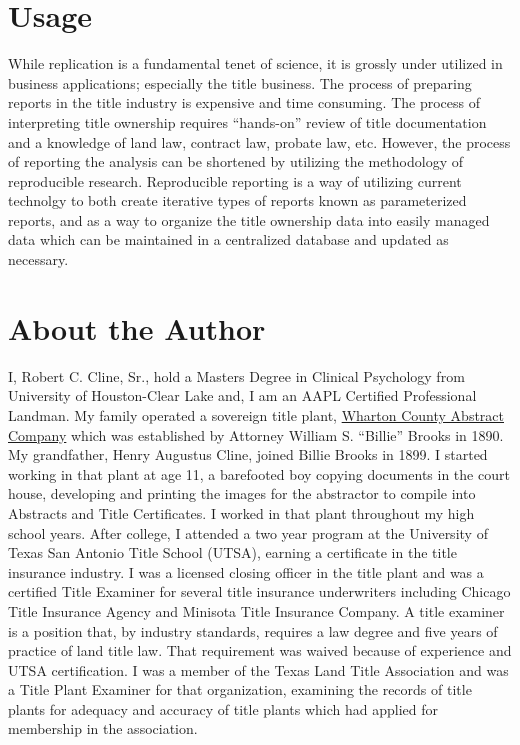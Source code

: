 \documentclass[
]{book}
\begin{document}
\hypertarget{usage}{%
\section{Usage}\label{usage}}

While replication is a fundamental tenet of science, it is grossly under utilized in business applications; especially the title business. The process of preparing reports in the title industry is expensive and time consuming. The process of interpreting title ownership requires ``hands-on'' review of title documentation and a knowledge of land law, contract law, probate law, etc. However, the process of reporting the analysis can be shortened by utilizing the methodology of reproducible research. Reproducible reporting is a way of utilizing current technolgy to both create iterative types of reports known as parameterized reports, and as a way to organize the title ownership data into easily managed data which can be maintained in a centralized database and updated as necessary.

\hypertarget{about-the-author}{%
\section{About the Author}\label{about-the-author}}

I, Robert C. Cline, Sr., hold a Masters Degree in Clinical Psychology from University of Houston-Clear Lake and, I am an AAPL Certified Professional Landman. My family operated a sovereign title plant, \href{http://www.stxmaps.com/go/texas-historical-marker-wharton-county-abstract-company.html}{Wharton County Abstract Company} which was established by Attorney William S. ``Billie'' Brooks in 1890. My grandfather, Henry Augustus Cline, joined Billie Brooks in 1899. I started working in that plant at age 11, a barefooted boy copying documents in the court house, developing and printing the images for the abstractor to compile into Abstracts and Title Certificates. I worked in that plant throughout my high school years. After college, I attended a two year program at the University of Texas San Antonio Title School (UTSA), earning a certificate in the title insurance industry. I was a licensed closing officer in the title plant and was a certified Title Examiner for several title insurance underwriters including Chicago Title Insurance Agency and Minisota Title Insurance Company. A title examiner is a position that, by industry standards, requires a law degree and five years of practice of land title law. That requirement was waived because of experience and UTSA certification. I was a member of the Texas Land Title Association and was a Title Plant Examiner for that organization, examining the records of title plants for adequacy and accuracy of title plants which had applied for membership in the association.
\end{document}
